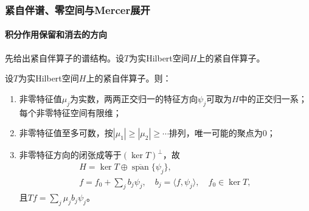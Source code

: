 \subsubsection{紧自伴谱、零空间与Mercer展开}
\label{subsubsec:compact-spectrum-mercer}

\paragraph{积分作用保留和消去的方向}

先给出紧自伴算子的谱结构。设$T$为实Hilbert空间$H$上的紧自伴算子。

\begin{theorem}[紧自伴算子谱定理]
\label{thm:compact-selfadjoint}
设$T$为实Hilbert空间$H$上的紧自伴算子。则：
\begin{enumerate}
\item 非零特征值$\mu_j$为实数，两两正交归一的特征方向$\psi_j$可取为$H$中的正交归一系；每个非零特征空间有限维；
\item 非零特征值至多可数，按$|\mu_1|\ge|\mu_2|\ge\cdots$排列，唯一可能的聚点为$0$；
\item 非零特征方向的闭张成等于$(\ker T)^\perp$，故
\[
\begin{aligned}
H=\ker T\oplus\overline{\operatorname{span}}\{\psi_j\},\\
f=f_0+\sum_j b_j\psi_j,\quad b_j=\langle f,\psi_j\rangle,\quad f_0\in\ker T,
\end{aligned}
\]
且$Tf=\sum_j\mu_jb_j\psi_j$。
\end{enumerate}
\end{theorem}


